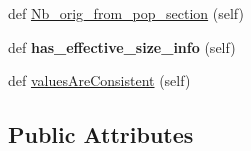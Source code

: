 \begin{DoxyCompactItemize}
\item 
def \hyperlink{classnegui_1_1pginputsimupop_1_1PGInputSimuPop_aeb297f90a0b2af488b18c12bbdd103f9}{Nb\+\_\+orig\+\_\+from\+\_\+pop\+\_\+section} (self)
\item 
def {\bfseries has\+\_\+effective\+\_\+size\+\_\+info} (self)\hypertarget{classnegui_1_1pginputsimupop_1_1PGInputSimuPop_ae4e33b0f078fbbe3cce07a9d572958e8}{}\label{classnegui_1_1pginputsimupop_1_1PGInputSimuPop_ae4e33b0f078fbbe3cce07a9d572958e8}

\item 
def \hyperlink{classnegui_1_1pginputsimupop_1_1PGInputSimuPop_a0bdcb5724f48860a0034162fa91dccfe}{values\+Are\+Consistent} (self)
\end{DoxyCompactItemize}
\subsection*{Public Attributes}
